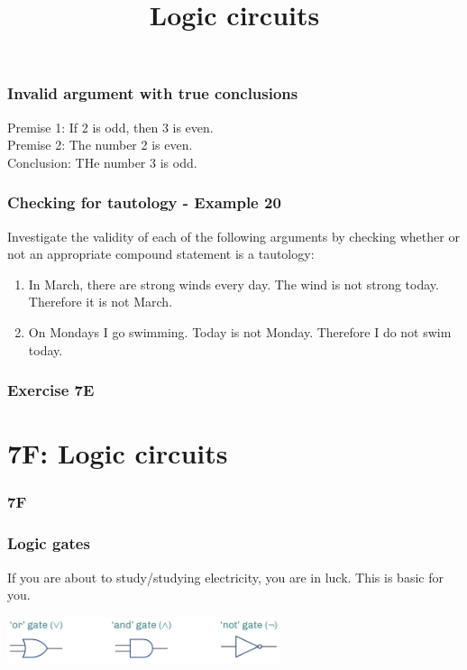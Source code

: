 \documentclass[
	11pt, %
]{beamer}
\begin{document}
\begin{frame}
    \frametitle{Invalid argument with true conclusions}
    Premise 1: If 2 is odd, then 3 is even.\\
    Premise 2: The number 2 is even.\\
    Conclusion: THe number 3 is odd.
\end{frame}

\begin{frame}[t]
    \frametitle{Checking for tautology - Example 20}
    Investigate the validity of each of the following arguments by checking whether or not an
    appropriate compound statement is a tautology:\\
    \begin{enumerate}
        \item In March, there are strong winds every day. The wind is not strong today. Therefore it
        is not March.
        \item  On Mondays I go swimming. Today is not Monday. Therefore I do not swim today.
    \end{enumerate}
\end{frame}
\begin{frame}
\end{frame}

\begin{frame}
    \frametitle{Exercise 7E}
\end{frame}

\section{7F: Logic circuits}
\begin{frame}
    \frametitle{7F}
    \begin{center}
        \title{Logic circuits}
        \maketitle
    \end{center}
\end{frame}

\begin{frame}
    \frametitle{Logic gates}
    If you are about to study/studying electricity, you are in luck. This is basic for you.\\
    \begin{center}
        \includegraphics[width = 8cm]{Gates.png}
    \end{center}
\end{frame}
\end{document}
